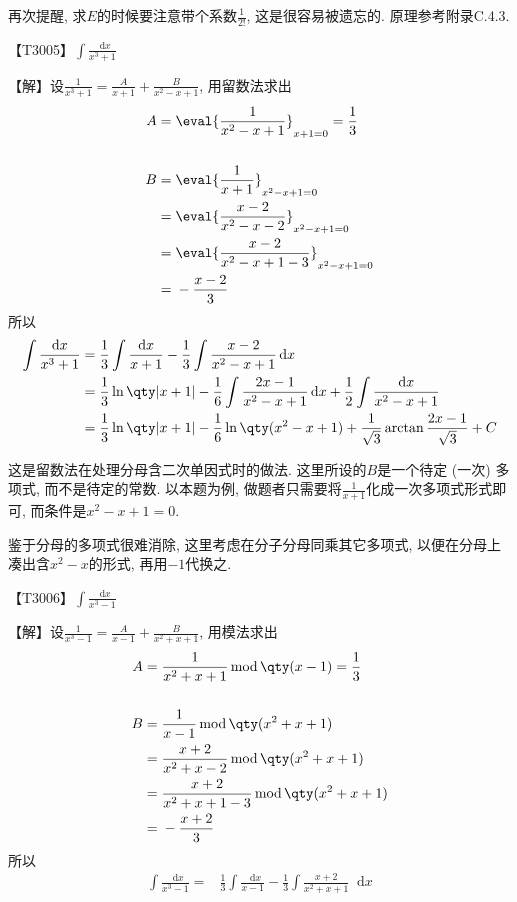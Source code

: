 \documentclass{ctexbook}
\newcommand*{\dif}{\mathop{}\!\mathrm{d}}
\newcommand{\m}{\,\mathrm{mod}\,}
\begin{document}
{{再次提醒, 求$E$的时候要注意带个系数$\frac{1}{2!}$, 这是很容易被遗忘的. 原理参考附录C.4.3. \par}
{\color{red}【T3005】}$\int\frac{\dif{x}}{x^{3}+1}$\par
【解】设$\frac{1}{x^{3}+1}=\frac{A}{x+1}+\frac{B}{x^{2}-x+1}$, 用留数法求出
\begin{align*}
A={}&\eval{\frac{1}{x^{2}-x+1}}_{x+1=0}=\frac{1}{3}\\
\\
B={}&\eval{\frac{1}{x+1}}_{x^{2}-x+1=0}\\
={}&\eval{\frac{x-2}{x^{2}-x-2}}_{x^{2}-x+1=0}\\
={}&\eval{\frac{x-2}{x^{2}-x+1-3}}_{x^{2}-x+1=0}\\
={}&-\frac{x-2}{3}
\end{align*}
所以
\begin{align*}
\int\frac{\dif{x}}{x^{3}+1}={}&\frac{1}{3}\int\frac{\dif{x}}{x+1}-\frac{1}{3}\int\frac{x-2}{x^{2}-x+1}\dif{x}\\
={}&\frac{1}{3}\ln\qty|x+1|-\frac{1}{6}\int\frac{2x-1}{x^{2}-x+1}\dif{x}+\frac{1}{2}\int\frac{\dif{x}}{x^{2}-x+1}\\
={}&\frac{1}{3}\ln\qty|x+1|-\frac{1}{6}\ln\qty(x^{2}-x+1)+\frac{1}{\sqrt{3}}\arctan{\frac{2x-1}{\sqrt{3}}}+C
\end{align*}\par
{\kaishu 这是留数法在处理分母含二次单因式时的做法. 这里所设的$B$是一个待定 (一次) 多项式, 而不是待定的常数. 以本题为例, 做题者只需要将$\frac{1}{x+1}$化成一次多项式形式即可, 而条件是$x^{2}-x+1=0$. \par
鉴于分母的多项式很难消除, 这里考虑在分子分母同乘其它多项式, 以便在分母上凑出含$x^{2}-x$的形式, 再用$-1$代换之. \par}
{\color{red}【T3006】}$\int\frac{\dif{x}}{x^{3}-1}$\par
【解】设$\frac{1}{x^{3}-1}=\frac{A}{x-1}+\frac{B}{x^{2}+x+1}$, 用模法求出
\begin{align*}
A={}&\frac{1}{x^{2}+x+1}\m\qty(x-1)=\frac{1}{3}\\
\\
B={}&\frac{1}{x-1}\m\qty(x^{2}+x+1)\\
={}&\frac{x+2}{x^{2}+x-2}\m\qty(x^{2}+x+1)\\
={}&\frac{x+2}{x^{2}+x+1-3}\m\qty(x^{2}+x+1)\\
={}&-\frac{x+2}{3}
\end{align*}
所以
\begin{align*}
\int\frac{\dif{x}}{x^{3}-1}={}&\frac{1}{3}\int\frac{\dif{x}}{x-1}-\frac{1}{3}\int\frac{x+2}{x^{2}+x+1}\dif{x}\\

\end{align*}}
\end{document}
